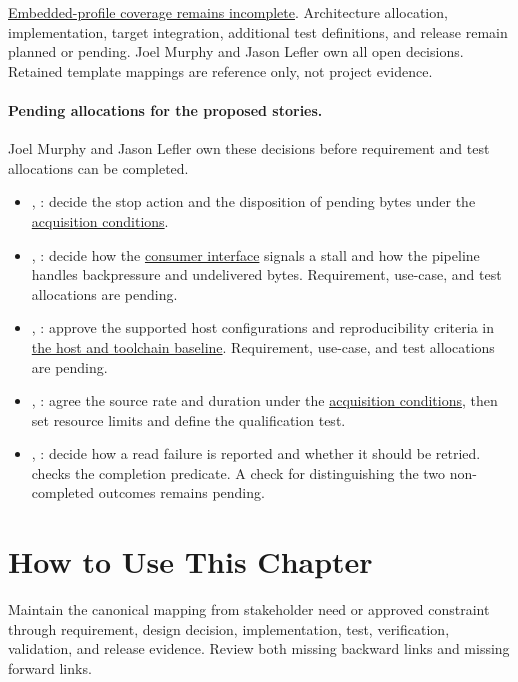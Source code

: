 \normalsize
\hyperref[Table:ProjectProfileConcernCoverage]{Embedded-profile coverage remains incomplete}.
Architecture allocation, implementation, target integration, additional test
definitions, and release remain planned or pending. Joel Murphy and Jason Lefler own all open
decisions. Retained template mappings are reference only, not project evidence.

\paragraph{Pending allocations for the proposed stories.}
\label{Section:AdditionalStoryAllocations}
Joel Murphy and Jason Lefler own these decisions before requirement and test
allocations can be completed.
\begin{itemize}
\item {}, : decide the stop action
and the disposition of pending bytes under the
\hyperref[Section:ProjectAcquisitionConditions]{acquisition conditions}.
\item {}, : decide how the
\hyperref[Table:ProjectInterfaces]{consumer interface} signals a stall and
how the pipeline handles backpressure and undelivered bytes. Requirement,
use-case, and test allocations are pending.
\item {}, : approve the supported
host configurations and reproducibility criteria in
\hyperref[Section:ToolchainHostAssumptions]{the host and toolchain baseline}.
Requirement, use-case, and test allocations are pending.
\item {}, : agree the source rate
and duration under the
\hyperref[Section:ProjectAcquisitionConditions]{acquisition conditions},
then set resource limits and define the qualification test.
\item {}, : decide how a read
failure is reported and whether it should be retried.
 checks the completion predicate. A check for
distinguishing the two non-completed outcomes remains pending.
\end{itemize}

\section{How to Use This Chapter}
Maintain the canonical mapping from stakeholder need or approved constraint through requirement, design decision, implementation, test, verification, validation, and release evidence. Review both missing backward links and missing forward links.
